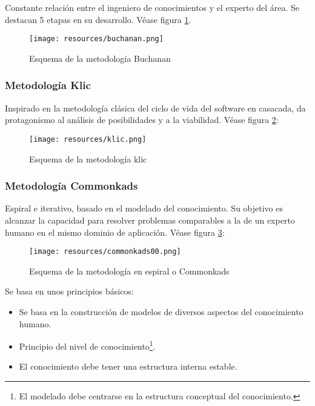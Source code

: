 \documentclass[a4paper, 11pt, titlepage]{article}
\begin{document}
            Constante relación entre el ingeniero de conocimientos y el experto del área.
            Se destacan 5 etapas en su desarrollo. Véase figura \ref{buchanan}.

            \begin{figure}[htp]
                \centering
                \texttt{[image: resources/buchanan.png]}
                \caption{Esquema de la metodología Buchanan}
                \label{buchanan}
            \end{figure}    
    
        \subsubsection{Metodología Klic}

            Inspirado en la metodología clásica del ciclo de vida del software en casacada,
            da protagonismo al análisis de posibilidades y a la viabilidad. Véase figura 
            \ref{klic}:

            \begin{figure}[htp]
                \centering
                \texttt{[image: resources/klic.png]}
                \caption{Esquema de la metodología klic}
                \label{klic}
            \end{figure}    

        \subsubsection{Metodología Commonkads}

            Espiral e iterativo, basado en el modelado del conocimiento. Su objetivo es 
            alcanzar la capacidad para resolver problemas comparables a la de un experto 
            humano en el mismo dominio de aplicación. Véase figura \ref{commonkads00}:

            \begin{figure}[htp]
                \centering
                \texttt{[image: resources/commonkads00.png]}
                \caption{Esquema de la metodología en espiral o Commonkads}
                \label{commonkads00}
            \end{figure}    

            Se basa en unos principios básicos:

            \begin{itemize}
                \item Se basa en la construcción de modelos de diversos aspectos del 
                conocimiento humano.
                \item Principio del nivel de conocimiento\footnote{
                    El modelado debe centrarse en la estructura conceptual del conocimiento.
                }.
                \item El conocimiento debe tener una estructura interna estable.
            \end{itemize}
\end{document}
